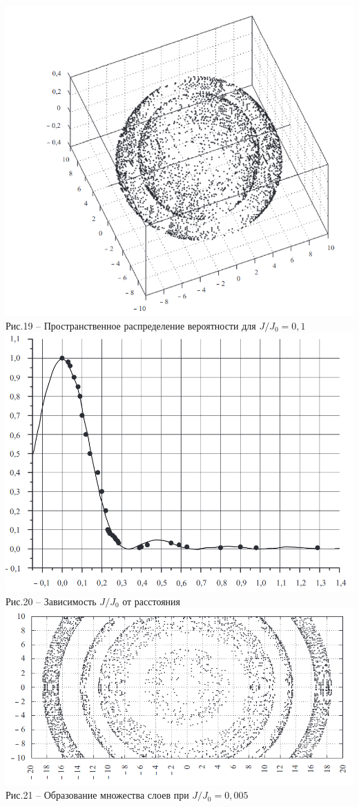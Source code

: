 \documentclass[11pt]{report}
\begin{document}
\includegraphics[scale=0.4]{ng_6}\\
Рис.19 -- Пространственное распределение вероятности для $J/J_0 = 0,1 $\\

\includegraphics[scale=0.4]{ng_5}\\
Рис.20 -- Зависимость $J/J_0$  от расстояния\\

\includegraphics[scale=0.4]{ng_4}\\
Рис.21 -- Образование множества слоев при $J/J_0 = 0,005 $\\
\end{document}

